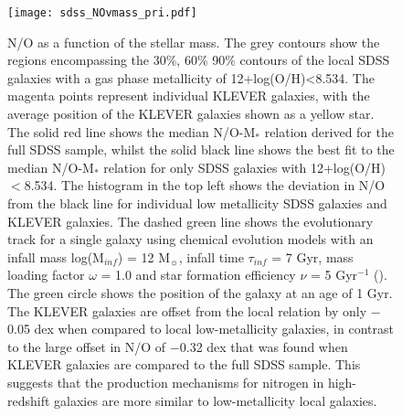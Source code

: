 \documentclass[usenatbib]{mnras} %
\begin{document}
\begin{figure}
\texttt{[image: sdss\_NOvmass\_pri.pdf]}
\caption{N/O as a function of the stellar mass. The grey contours show the regions encompassing the 30\%, 60\% 90\% contours of the local SDSS galaxies with a gas phase metallicity of 12+log(O/H)<8.534. The magenta points represent individual KLEVER  galaxies, with the average position of the KLEVER galaxies shown as a yellow star. The solid red line shows the median N/O-M$_{*}$ relation derived for the full SDSS sample, whilst the solid black line shows the best fit to the median N/O-M$_{*}$ relation for only SDSS galaxies with 12+log(O/H)$<$8.534. The histogram in the top left shows the deviation in N/O from the black line for individual low metallicity SDSS galaxies and KLEVER galaxies. The dashed green line shows the evolutionary track for a single galaxy using chemical evolution models with an infall mass log(M$_{inf}$) = 12 M$_{\sun}$, infall time $\tau_{inf}$ = 7 Gyr, mass loading factor $\omega$ = 1.0 and star formation efficiency $\nu$ = 5 Gyr$^{-1}$ (\citealt{Vincenzo_2016}). The green circle shows the position of the galaxy at an age of 1 Gyr. The KLEVER galaxies are offset from the local relation by only $-$0.05 dex when compared to local low-metallicity galaxies, in contrast to the large offset in N/O of $-$0.32 dex that was found when KLEVER galaxies are compared to the full SDSS sample. This suggests that the production mechanisms for nitrogen in high-redshift galaxies are more similar to low-metallicity local galaxies.}
\label{fig:SDSS_KLEVER_NOOH_pri}
\end{figure}
\end{document}
